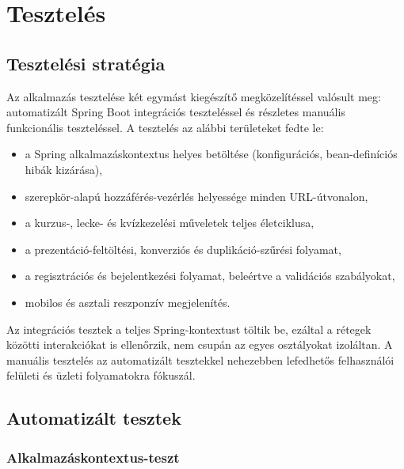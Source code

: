 \chapter{Tesztelés}

\section{Tesztelési stratégia}

Az alkalmazás tesztelése két egymást kiegészítő megközelítéssel valósult meg: automatizált Spring Boot integrációs teszteléssel és részletes manuális funkcionális teszteléssel. A tesztelés az alábbi területeket fedte le:

\begin{itemize}
    \item a Spring alkalmazáskontextus helyes betöltése (konfigurációs, bean-definíciós hibák kizárása),
    \item szerepkör-alapú hozzáférés-vezérlés helyessége minden URL-útvonalon,
    \item a kurzus-, lecke- és kvízkezelési műveletek teljes életciklusa,
    \item a prezentáció-feltöltési, konverziós és duplikáció-szűrési folyamat,
    \item a regisztrációs és bejelentkezési folyamat, beleértve a validációs szabályokat,
    \item mobilos és asztali reszponzív megjelenítés.
\end{itemize}

Az integrációs tesztek a teljes Spring-kontextust töltik be, ezáltal a rétegek közötti interakciókat is ellenőrzik, nem csupán az egyes osztályokat izoláltan. A manuális tesztelés az automatizált tesztekkel nehezebben lefedhetős felhasználói felületi és üzleti folyamatokra fókuszál.

\section{Automatizált tesztek}

\subsection{Alkalmazáskontextus-teszt}

